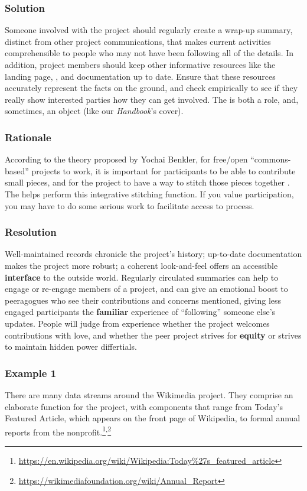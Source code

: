 \subsubsection*{Solution}
Someone involved with the project should regularly create a wrap-up summary, distinct from other project communications, that makes current activities comprehensible to people who may not have been following all of the details.  In addition, project members should keep other informative resources like the landing page, , and documentation up to date.  Ensure that these resources accurately represent the facts on the ground, and check empirically to see if they really show interested parties how they can get involved.
The  is both a role, and, sometimes, an object (like our \emph{Handbook}'s cover).

\subsubsection*{Rationale}
According to the theory proposed by Yochai Benkler, for free/open ``commons-based'' projects to work, it is important for participants to be able to contribute small pieces, and for the project to have a way to stitch those pieces together \cite{coases-penguin}.  The  helps perform this integrative stitching function.  If you value participation, you may have to do some serious work to facilitate access to process.

\subsubsection*{Resolution} 
Well-maintained records chronicle the project's history; up-to-date documentation makes the project more robust; a coherent look-and-feel offers an accessible \textbf{interface} to the outside world.  Regularly circulated summaries can help to engage or re-engage members of a project, and can give an emotional boost to peeragogues who see their contributions and concerns mentioned, giving less engaged participants the \textbf{familiar} experience of ``following'' someone else's updates. People will judge from experience whether the project welcomes contributions with love, and whether the peer project strives for \textbf{equity} or strives to maintain hidden power differtials.  

\subsubsection*{Example 1} 
There are many data streams around the Wikimedia project.  They comprise
an elaborate  function for the project, with components
that range from Today's Featured Article, which appears on the front page of
Wikipedia, to formal annual reports from the  nonprofit.\footnote{\url{https://en.wikipedia.org/wiki/Wikipedia:Today\%27s_featured_article}}\textsuperscript{,}\footnote{\url{https://wikimediafoundation.org/wiki/Annual_Report}}

